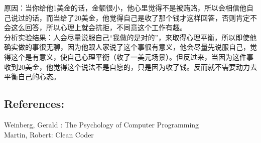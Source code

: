原因：当你给他1美金的话，金额很小，他心里觉得不是被贿赂，所以会相信他自己说过的话，而当给了20美金，他觉得自己是收了那个钱才这样回答，否则肯定不会这么回答，所以心理上就会抗拒，不同意这个工作有趣。\\

分析实验结果：人会尽量说服自己“我做的是对的”，来取得心理平衡，所以即使他确实做的事很无聊，因为他跟人家说了这个事很有意义，他会尽量先说服自己，觉得这个是有意义，使自己心理平衡（收了一美元场景）。但反过来，当因为这件事收到20美金，他觉得这个说法不是自愿的，只是因为收了钱。反而就不需要动力去平衡自己的心态。\\




\hypertarget{a1ux5e73ux8861ux5fc3ux6001-cognitive-dissonance}{%
\subsection{References:}\label{a1ux5e73ux8861ux5fc3ux6001-cognitive-dissonance}}

Weinberg, Gerald : The Psychology of Computer Programming\\
Martin, Robert: Clean Coder\\

